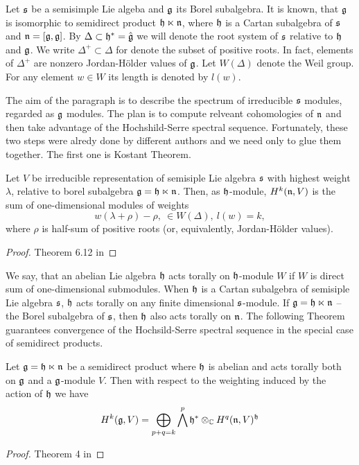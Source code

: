 Let $\mathfrak{s}$ be a semisimple Lie algeba and $\mathfrak{g}$ its Borel subalgebra. It is known, that $\mathfrak{g}$ is isomorphic to semidirect product $\mathfrak{h} \ltimes \mathfrak{n}$, where $\mathfrak{h}$ is
a Cartan subalgebra of $\mathfrak{s}$ and $\mathfrak{n} = [\mathfrak{g}, \mathfrak{g}]$. By $\Delta \subset \mathfrak{h}^* =
\hat{\mathfrak{g}}$ we will denote the root system of $\mathfrak{s}$ relative to $\mathfrak{h}$ and $\mathfrak{g}$. We write
$\Delta^+ \subset \Delta$ for denote the subset of positive roots. In fact, elements of $\Delta^+$
are nonzero Jordan-H\"older values of $\mathfrak{g}$. Let $W(\Delta)$ denote the Weil group. For any
element $w\in W$ its length is denoted by $l(w)$. 

The aim of the paragraph is to describe the spectrum of irreducible $\mathfrak{s}$ modules, regarded
as $\mathfrak{g}$ modules. The plan is to compute relveant cohomologies of $\mathfrak{n}$ and then take advantage
of the Hochshild-Serre spectral sequence. Fortunately, these two steps were alredy done by
different authors and we need only to glue them together. The first one is Kostant Theorem.
\begin{theorem}[Kostant]
   Let $V$ be irreducible representation of semisiple Lie algebra $\mathfrak{s}$ with highest weight
   $\lambda$, relative to borel subalgebra $\mathfrak{g} = \mathfrak{h} \ltimes \mathfrak{n}$. Then, as $\mathfrak{h}$-module,
   $H^k(\mathfrak{n}, V)$ is the sum of one-dimensional modules of weights
   \[
       w(\lambda + \rho) - \rho,~\in W(\Delta), ~l(w) = k,
   \]
   where $\rho$ is half-sum of positive roots (or, equivalently, Jordan-H\"older values).
\end{theorem}
\begin{proof}
    Theorem 6.12 in  
\end{proof}
We say, that an abelian Lie algebra $\mathfrak{h}$ acts torally on $\mathfrak{h}$-module $W$ if $W$ is direct sum
of one-dimensional submodules. When $\mathfrak{h}$ is a Cartan subalgebra of semisiple Lie algebra
$\mathfrak{s}$, $\mathfrak{h}$ acts torally on any finite dimensional $\mathfrak{s}$-module. If $\mathfrak{g} = \mathfrak{h} \ltimes
\mathfrak{n}$ -- the Borel subalgebra of $\mathfrak{s}$, then $\mathfrak{h}$ also acts torally on $\mathfrak{n}$. The following
Theorem guarantees convergence of the Hochsild-Serre spectral sequence in the special case of
semidirect products.
\begin{theorem}
    Let $\mathfrak{g}=\mathfrak{h}\ltimes\mathfrak{n}$ be a semidirect product where $\mathfrak{h}$ is abelian and acts torally
    both on $\mathfrak{g}$ and a $\mathfrak{g}$-module $V$. Then with respect to the weighting induced by the
    action of $\mathfrak{h}$ we have 
    \begin{equation} \label{t:coll:1}
        H^k(\mathfrak{g}, V) = \bigoplus_{p + q = k} \bigwedge^p\mathfrak{h}^* \otimes_{\mathbb{C}} H^q(\mathfrak{n}, V)^{\mathfrak{h}}
    \end{equation} 
\end{theorem}
\begin{proof}
    Theorem 4 in  
\end{proof}


